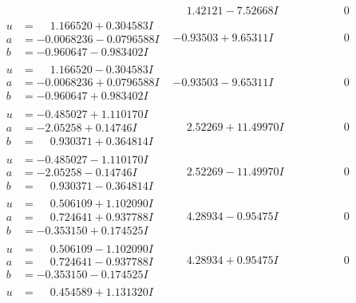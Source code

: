 \documentclass[1p]{elsarticle_modified}
\theoremstyle{definition}
\begin{document}
$$\begin{array}{c|c|c}
 & \phantom{-}1.42121 - 7.52668 I & \phantom{-0.000000 } 0 \\ \hline\begin{aligned}
u &= \phantom{-}1.166520 + 0.304583 I \\
a &= -0.0068236 - 0.0796588 I \\
b &= -0.960647 - 0.983402 I\end{aligned}
 & -0.93503 + 9.65311 I & \phantom{-0.000000 } 0 \\ \hline\begin{aligned}
u &= \phantom{-}1.166520 - 0.304583 I \\
a &= -0.0068236 + 0.0796588 I \\
b &= -0.960647 + 0.983402 I\end{aligned}
 & -0.93503 - 9.65311 I & \phantom{-0.000000 } 0 \\ \hline\begin{aligned}
u &= -0.485027 + 1.110170 I \\
a &= -2.05258 + 0.14746 I \\
b &= \phantom{-}0.930371 + 0.364814 I\end{aligned}
 & \phantom{-}2.52269 + 11.49970 I & \phantom{-0.000000 } 0 \\ \hline\begin{aligned}
u &= -0.485027 - 1.110170 I \\
a &= -2.05258 - 0.14746 I \\
b &= \phantom{-}0.930371 - 0.364814 I\end{aligned}
 & \phantom{-}2.52269 - 11.49970 I & \phantom{-0.000000 } 0 \\ \hline\begin{aligned}
u &= \phantom{-}0.506109 + 1.102090 I \\
a &= \phantom{-}0.724641 + 0.937788 I \\
b &= -0.353150 + 0.174525 I\end{aligned}
 & \phantom{-}4.28934 - 0.95475 I & \phantom{-0.000000 } 0 \\ \hline\begin{aligned}
u &= \phantom{-}0.506109 - 1.102090 I \\
a &= \phantom{-}0.724641 - 0.937788 I \\
b &= -0.353150 - 0.174525 I\end{aligned}
 & \phantom{-}4.28934 + 0.95475 I & \phantom{-0.000000 } 0 \\ \hline\begin{aligned}
u &= \phantom{-}0.454589 + 1.131320 I \\

\end{aligned}
\end{array}$$
\end{document}
